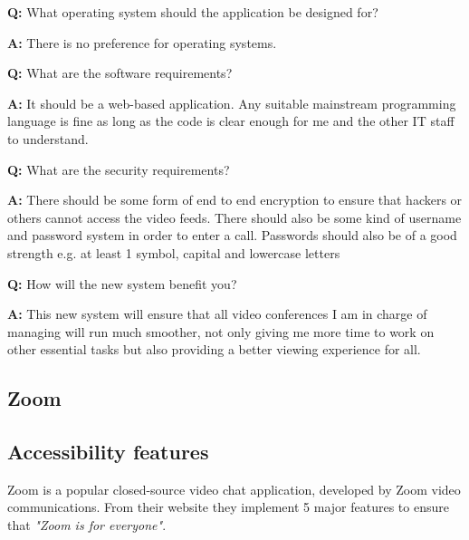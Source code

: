 \begin{tcolorbox}[
  boxrule=0pt, frame empty, colback=lightestgray, arc=0pt
]
  \textbf{Q:} What operating system should the application be 
  designed for? \vspace{0.05cm}

  \textbf{A:} There is no preference for operating systems.
  \vspace{0.25cm}

  \textbf{Q:} What are the software requirements? 
  \vspace{0.05cm}

  \textbf{A:} It should be a web-based application. Any 
  suitable mainstream programming language is fine as long as 
  the code is clear enough for me and the other IT staff to 
  understand.
  \vspace{0.25cm}

  \textbf{Q:} What are the security requirements?
  \vspace{0.05cm}

  \textbf{A:} There should be some form of end to end 
  encryption to ensure that hackers or others cannot access the
  video feeds. There should also be some kind of username and 
  password system in order to enter a call. Passwords should 
  also be of a good strength e.g. at least 1 symbol, capital
  and lowercase letters
  \vspace{0.25cm}

  \textbf{Q:} How will the new system benefit you? 
  \vspace{0.05cm}

  \textbf{A:} This new system will ensure that all video 
  conferences I am in charge of managing will run much 
  smoother, not only giving me more time to work on other 
  essential tasks but also providing a better viewing
  experience for all.

\end{tcolorbox}

\subsection*{Zoom}

\subsection*{Accessibility features}

Zoom is a popular closed-source video chat application,
developed by Zoom video communications. From their website 
\cite{zoom} they implement 5 major features to ensure that 
\textit{"Zoom is for everyone"}.

